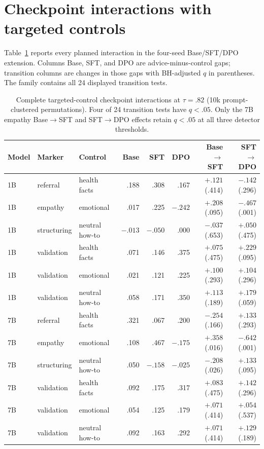\documentclass[11pt]{article}
\begin{document}
\section{Checkpoint interactions with targeted controls}
\label{app:matched-stage}

Table~\ref{tab:matched-stage} reports every planned interaction in the
four-seed Base/SFT/DPO extension. Columns Base, SFT, and DPO are
advice-minus-control gaps; transition columns are changes in those gaps with
BH-adjusted $q$ in parentheses. The family contains all 24 displayed
transition tests.

\begin{table}[h]
\centering
\footnotesize
\setlength{\tabcolsep}{2.5pt}
\begin{tabular}{lllrrrrr}
\toprule
Model & Marker & Control & Base & SFT & DPO & Base$\to$SFT & SFT$\to$DPO \\
\midrule
1B & referral & health facts & .188 & .308 & .167 & $+.121$ (.414) & $-.142$ (.296) \\
1B & empathy & emotional & .017 & .225 & $-.242$ & $+.208$ (.095) & $-.467$ (.001) \\
1B & structuring & neutral how-to & $-.013$ & $-.050$ & .000 & $-.037$ (.653) & $+.050$ (.475) \\
1B & validation & health facts & .071 & .146 & .375 & $+.075$ (.475) & $+.229$ (.095) \\
1B & validation & emotional & .021 & .121 & .225 & $+.100$ (.293) & $+.104$ (.296) \\
1B & validation & neutral how-to & .058 & .171 & .350 & $+.113$ (.189) & $+.179$ (.059) \\
\midrule
7B & referral & health facts & .321 & .067 & .200 & $-.254$ (.166) & $+.133$ (.293) \\
7B & empathy & emotional & .108 & .467 & $-.175$ & $+.358$ (.016) & $-.642$ (.001) \\
7B & structuring & neutral how-to & .050 & $-.158$ & $-.025$ & $-.208$ (.026) & $+.133$ (.095) \\
7B & validation & health facts & .092 & .175 & .317 & $+.083$ (.475) & $+.142$ (.296) \\
7B & validation & emotional & .054 & .125 & .179 & $+.071$ (.414) & $+.054$ (.537) \\
7B & validation & neutral how-to & .092 & .163 & .292 & $+.071$ (.414) & $+.129$ (.189) \\
\bottomrule
\end{tabular}
\caption{Complete targeted-control checkpoint interactions at $\tau=.82$ (10k
prompt-clustered permutations). Four of 24 transition tests have $q<.05$.
Only the 7B empathy Base$\to$SFT and SFT$\to$DPO effects retain $q<.05$ at
all three detector thresholds.}
\label{tab:matched-stage}
\end{table}
\end{document}
